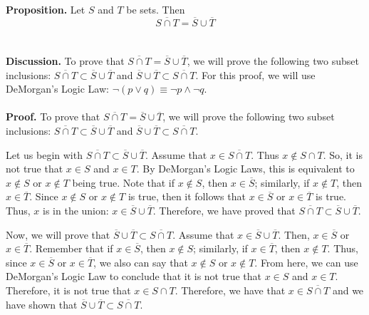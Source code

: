\documentclass[12pt]{exam}
\begin{document}
\begin{questions}


\question
\textbf{Proposition.} Let $S$ and $T$ be sets. Then
\begin{equation*}
\overline{S \cap T} = \overline{S} \cup \overline{T}
\end{equation*}
\\
\\\textbf{Discussion.} To prove that $\overline{S \cap T} = \overline{S} \cup \overline{T}$, we will prove the following two subset inclusions: $\overline{S \cap T} \subset \overline{S} \cup \overline{T}$ and $ \overline{S} \cup \overline{T}\subset \overline{S \cap T}$. For this proof, we will use DeMorgan's Logic Law: $\neg(p \vee q) \equiv \neg p \wedge \neg q$.
\\
\\\textbf{Proof.} To prove that $\overline{S \cap T} = \overline{S} \cup \overline{T}$, we will prove the following two subset inclusions: $\overline{S \cap T} \subset \overline{S} \cup \overline{T}$ and $ \overline{S} \cup \overline{T}\subset \overline{S \cap T}$.
\par 
Let us begin with $\overline{S \cap T} \subset \overline{S} \cup \overline{T}$. Assume that $x \in \overline{S \cap T}$. Thus $x \notin S \cap T$. So, it is not true that $x \in S$ and $x \in T$. By DeMorgan's Logic Laws, this is equivalent to $x \notin S$ or $x \notin T$ being true. Note that if $x \notin S$, then $x \in \overline{S}$; similarly, if $x \notin T$, then $x \in \overline{T}$. Since $x \notin S$ or $x \notin T$ is true, then it follows that $x \in \overline{S}$ or $x \in \overline{T}$ is true. Thus, $x$ is in the union:  $x \in \overline{S} \cup \overline{T}$. Therefore, we have proved that $\overline{S \cap T} \subset \overline{S} \cup \overline{T}$.
\par
Now, we will prove that $ \overline{S} \cup \overline{T}\subset \overline{S \cap T}$. Assume that $x \in  \overline{S} \cup \overline{T}$. Then, $x \in \overline{S}$ or $x \in \overline{T}$. Remember that if $x \in \overline{S}$, then $x \notin S$; similarly, if $x \in \overline{T}$, then $x \notin T$. Thus, since $x \in \overline{S}$ or $x \in \overline{T}$, we also can say that $x \notin S$ or $x \notin T$. From here, we can use DeMorgan's Logic Law to conclude that it is not true that $x \in S$ and $x \in T$. Therefore, it is not true that $x \in S \cap T$. Therefore, we have that $x \in \overline{S \cap T}$ and we have shown that $ \overline{S} \cup \overline{T}\subset \overline{S \cap T}$.

\end{questions}
\end{document}
